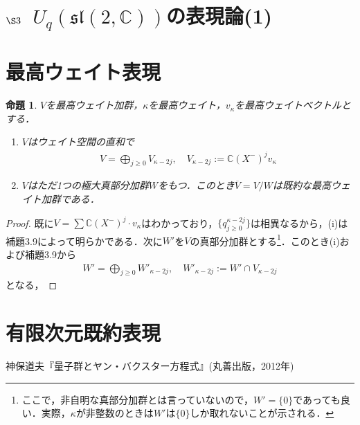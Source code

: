 \documentclass[dvipdfmx]{jsarticle}
\newtheorem{prop}{命題}[section]
\newtheorem{proof}{証明}
\begin{document}
\section*{$\S 3${\ }$U_q(\mathfrak{sl}(2,\mathbb{C}))$の表現論(1)}
\section*{最高ウェイト表現}
\setcounter{section}{3}
\setcounter{prop}{7}
\begin{prop}
$V$を最高ウェイト加群，$\kappa$を最高ウェイト，$v_\kappa$を最高ウェイトベクトルとする．
\begin{enumerate}
\renewcommand{\labelenumi}{(\roman{enumi})}
\item $V$はウェイト空間の直和で
\begin{align*}
V=\bigoplus_{j\geq 0}V_{\kappa-2j}, \quad V_{\kappa-2j}:=\mathbb{C}(X^-)^jv_\kappa
\end{align*}
\item $V$はただ1つの極大真部分加群$W$をもつ．このとき$\overline{V}=V/W$は既約な最高ウェイト加群である．
\end{enumerate}
\end{prop}
\begin{proof}
既に$V=\sum \mathbb{C}(X^-)^j\cdot v_\kappa$はわかっており，$\{q^{\kappa-2j}_{j\geq 0}\}$は相異なるから，(i)は補題3.9によって明らかである．次に$W'$を$V$の真部分加群とする\footnote{ここで，非自明な真部分加群とは言っていないので，$W'=\{0\}$であっても良い．実際，$\kappa$が非整数のときは$W'$は$\{0\}$しか取れないことが示される．}．このとき(i)および補題3.9から
\begin{align*}
W'=\bigoplus_{j\geq 0}W'_{\kappa-2j}, \quad W'_{\kappa-2j}:=W'\cap V_{\kappa-2j}
\end{align*}
となる，
\end{proof}
%
%
%
\section*{有限次元既約表現}
%
%
%
%
\begin{thebibliography}{99}
神保道夫『量子群とヤン・バクスター方程式』(丸善出版，2012年)
 \end{thebibliography}
%
%
%
%
\end{document}
